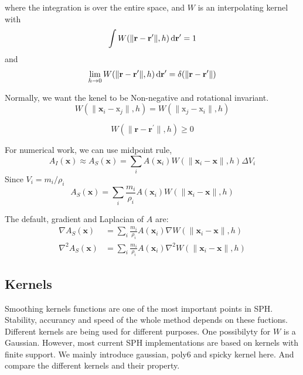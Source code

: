     where the integration is over the entire space, and $W$ is an interpolating kernel with 
    \begin{equation}
        \int W(\|\textbf{r} - \textbf{r}^{\prime}\|, h)\,\mathrm{d} \textbf{r}^{\prime} = 1
    \end{equation}
    and
    \begin{equation}
        \lim_{h\to 0} W(\|\textbf{r} - \textbf{r}^{\prime}\|, h)\,\mathrm{d}\textbf{r}^{\prime} = \delta(\|\textbf{r} - \textbf{r}^{\prime}\|) 
    \end{equation}

    Normally, we want the kenel to be Non-negative and rotational invariant.
    \begin{equation}
        W(\|\textbf{x}_{i} - \text{x}_{j}\|, h) = W(\|\text{x}_{j} - \text{x}_{i}\|, h)
    \end{equation}

    \begin{equation}
        W(\|\textbf{r} - \textbf{r}^{\prime}\|, h) \ge 0
    \end{equation}

    For numerical work, we can use midpoint rule,
    \begin{equation}
        A_{I}(\textbf{x}) \approx A_{S}(\textbf{x}) = \sum_{i} A(\textbf{x}_{i})W(\|\textbf{x}_{i}-\textbf{x}\|, h)\Delta V_{i}
    \end{equation}
    Since $V_{i} = m_{i}/\rho _{i}$
    \begin{equation}
        A_{S}(\textbf{x}) = \sum_{i} \frac{m_{i}}{\rho_{i}} A(\textbf{x}_{i})W(\|\textbf{x}_{i}-\textbf{x}\|, h)
    \end{equation}

    The default, gradient and Laplacian of $A$ are:
    \begin{equation}
        \begin{aligned}
            \nabla A_{S}(\textbf{x}) &= \sum_{i} \frac{m_{i}}{\rho_{i}} A(\textbf{x}_{i})\nabla W(\|\textbf{x}_{i}-\textbf{x}\|, h) \\
            \nabla^{2} A_{S}(\textbf{x}) &= \sum_{i} \frac{m_{i}}{\rho_{i}} A(\textbf{x}_{i})\nabla^{2} W(\|\textbf{x}_{i}-\textbf{x}\|, h)
        \end{aligned}
        \label{eq:1}
    \end{equation}

    \subsection{Kernels}
    Smoothing kernels functions are one of the most important points in SPH. Stability, accurancy and speed of the whole method depends on these fuctions. Different kernels are being used for different purposes. One possibilyty for $W$ is a Gaussian. However, most current SPH implementations are based on kernels with finite support. We mainly introduce gaussian, poly6 and spicky kernel here. And compare the different kernels and their property.


